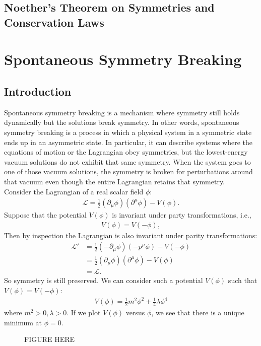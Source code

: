 \documentclass[a4paper,11pt]{article}
\numberwithin{equation}{section}
\theoremstyle{definition}
\newcommand{\p}{\partial}
\newcommand{\lag}{\mathcal{L}}
\begin{document}
\subsection{Noether's Theorem on Symmetries and Conservation Laws}

\newpage


\section{Spontaneous Symmetry Breaking}
\subsection{Introduction}
Spontaneous symmetry breaking is a mechanism where symmetry still holds dynamically but the solutions break symmetry. In other words, spontaneous symmetry breaking is a process in which a physical system in a symmetric state ends up in an asymmetric state. In particular, it can describe systems where the equations of motion or the Lagrangian obey symmetries, but the lowest-energy vacuum solutions do not exhibit that same symmetry. When the system goes to one of those vacuum solutions, the symmetry is broken for perturbations around that vacuum even though the entire Lagrangian retains that symmetry.\\

Consider the Lagrangian of a real scalar field $\phi$:
\begin{align}
\lag = \frac{1}{2}(\p_\mu\phi)(\p^\mu\phi) - V(\phi).
\end{align}
Suppose that the potential $V(\phi)$ is invariant under party transformations, i.e.,
\begin{align}
V(\phi) = V(-\phi),
\end{align}
Then by inspection the Lagrangian is also invariant under parity transformations:
\begin{align}
\lag' &= \frac{1}{2}(-\p_\mu\phi)(-p^\mu\phi) - V(-\phi)\\
&= \frac{1}{2}(\p_\mu\phi)(\p^\mu\phi) - V(\phi)\\
&= \lag.
\end{align}
So symmetry is still preserved. We can consider such a potential $V(\phi)$ such that $V(\phi) = V(-\phi)$:
\begin{align}
V(\phi) = \frac{1}{2}m^2\phi^2 + \frac{1}{4}\lambda\phi^4
\end{align}
where $m^2 > 0, \lambda > 0$. If we plot $V(\phi)$ versus $\phi$, we see that there is a unique minimum at $\phi = 0$. 
\begin{figure}[h!]
	FIGURE HERE
\end{figure}
\end{document}

